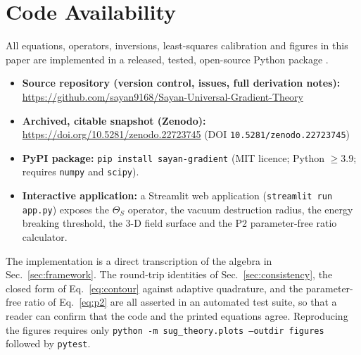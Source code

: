 \documentclass[11pt,a4paper]{article}
\newcommand{\code}[1]{\texttt{#1}}
\begin{document}
\section*{Code Availability}
\label{sec:code}

All equations, operators, inversions, least-squares calibration and figures in
this paper are implemented in a released, tested, open-source Python package
\cite{sug2026}.

\begin{itemize}
  \item \textbf{Source repository (version control, issues, full derivation
        notes):}
        \url{https://github.com/sayan9168/Sayan-Universal-Gradient-Theory}
  \item \textbf{Archived, citable snapshot (Zenodo):}
        \url{https://doi.org/10.5281/zenodo.22723745}
        \quad (DOI \code{10.5281/zenodo.22723745})
  \item \textbf{PyPI package:} \code{pip install sayan-gradient}
        (MIT licence; Python $\ge 3.9$; requires \code{numpy} and
        \code{scipy}).
  \item \textbf{Interactive application:} a Streamlit web application
        (\code{streamlit run app.py}) exposes the $\Theta_S$ operator, the
        vacuum destruction radius, the energy breaking threshold, the $3$-D
        field surface and the P2 parameter-free ratio calculator.
\end{itemize}

The implementation is a direct transcription of the algebra in
Sec.~\ref{sec:framework}. The round-trip identities of
Sec.~\ref{sec:consistency}, the closed form of Eq.~\eqref{eq:contour} against
adaptive quadrature, and the parameter-free ratio of Eq.~\eqref{eq:p2} are all
asserted in an automated test suite, so that a reader can confirm that the
code and the printed equations agree. Reproducing the figures requires only
\code{python -m sug\_theory.plots --outdir figures} followed by
\code{pytest}.
\end{document}

